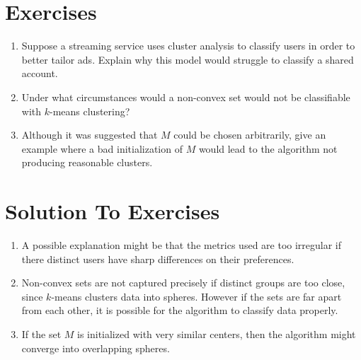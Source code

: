 \section{Exercises}

\begin{enumerate}
    \item Suppose a streaming service uses cluster analysis to classify users in order to better tailor ads. Explain why this model would struggle to classify a shared account.
    \item Under what circumstances would a non-convex set would not be classifiable with $k$-means clustering?
    \item Although it was suggested that $M$ could be chosen arbitrarily, give an example where a bad initialization of $M$ would lead to the algorithm not producing reasonable clusters.
\end{enumerate}

\section{Solution To Exercises}
\begin{enumerate}
    \item A possible explanation might be that the metrics used are too irregular if there distinct users have sharp differences on their preferences.
    \item Non-convex sets are not captured precisely if distinct groups are too close, since $k$-means clusters data into spheres. However if the sets are far apart from each other, it is possible for the algorithm to classify data properly.
    \item If the set $M$ is initialized with very similar centers, then the algorithm might converge into overlapping spheres.
\end{enumerate}